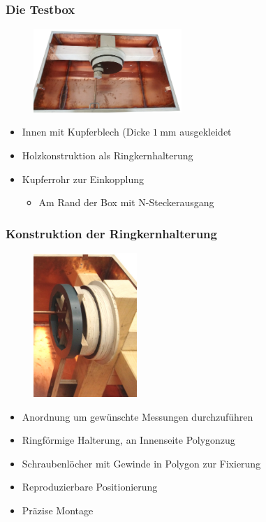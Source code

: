 \documentclass[accentcolor=tud9b, colorbacktitle, inverttitle]{tudbeamer}
\begin{document}
\begin{frame}\frametitle{Die Testbox}
\vspace{-1em}
\begin{multicols}{2}
	\begin{figure}[h]
		\centering
		\includegraphics[width=0.5\textwidth]{boxleer}
	\end{figure}
	\vfill\null
	\columnbreak
	\begin{itemize}
		\item Innen mit Kupferblech (Dicke $\SI{1}{\milli\meter}$ ausgekleidet
		\item Holzkonstruktion als Ringkernhalterung
		\item Kupferrohr zur Einkopplung
		\begin{itemize}
			\item Am Rand der Box mit N-Steckerausgang 
		\end{itemize}
	\end{itemize}
\end{multicols}
\end{frame}


\begin{frame}\frametitle{Konstruktion der Ringkernhalterung}
\vspace{-1em}
\begin{multicols}{2}
	\begin{figure}[h]
		\centering
		\includegraphics[width=0.35\textwidth]{BoxKreuzPolygonpraes}
	\end{figure}
	\vfill\null
	\columnbreak
	\begin{itemize}
		\item Anordnung um gew\"unschte Messungen durchzuf\"uhren
		\item Ringf\"ormige Halterung, an Innenseite Polygonzug
		\item Schraubenl\"ocher mit Gewinde in Polygon zur Fixierung
		\item Reproduzierbare Positionierung
		\item Pr\"azise Montage
	\end{itemize}
\end{multicols}
\end{frame}
\end{document}
